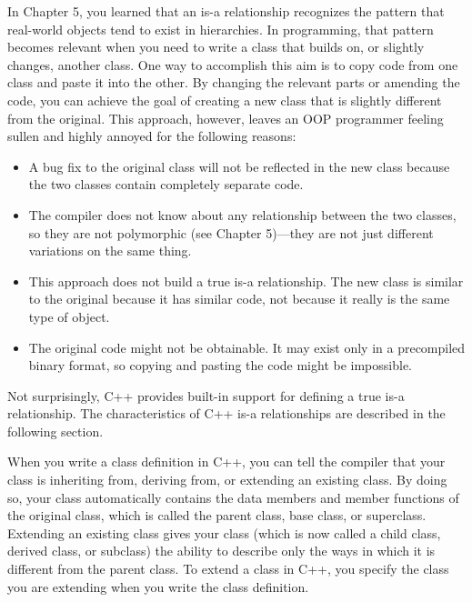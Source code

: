 
In Chapter 5, you learned that an is-a relationship recognizes the pattern that real-world objects tend to exist in hierarchies. In programming, that pattern becomes relevant when you need to write a class that builds on, or slightly changes, another class. One way to accomplish this aim is to copy code from one class and paste it into the other. By changing the relevant parts or amending the code, you can achieve the goal of creating a new class that is slightly different from the original. This approach, however, leaves an OOP programmer feeling sullen and highly annoyed for the following reasons:

\begin{itemize}
\item
A bug fix to the original class will not be reflected in the new class because the two classes contain completely separate code.

\item
The compiler does not know about any relationship between the two classes, so they are not polymorphic (see Chapter 5)—they are not just different variations on the same thing.

\item
This approach does not build a true is-a relationship. The new class is similar to the original because it has similar code, not because it really is the same type of object.

\item
The original code might not be obtainable. It may exist only in a precompiled binary format, so copying and pasting the code might be impossible.
\end{itemize}

Not surprisingly, C++ provides built-in support for defining a true is-a relationship. The characteristics of C++ is-a relationships are described in the following section.


When you write a class definition in C++, you can tell the compiler that your class is inheriting from, deriving from, or extending an existing class. By doing so, your class automatically contains the data members and member functions of the original class, which is called the parent class, base class, or superclass. Extending an existing class gives your class (which is now called a child class, derived class, or subclass) the ability to describe only the ways in which it is different from the parent class.
To extend a class in C++, you specify the class you are extending when you write the class definition.

